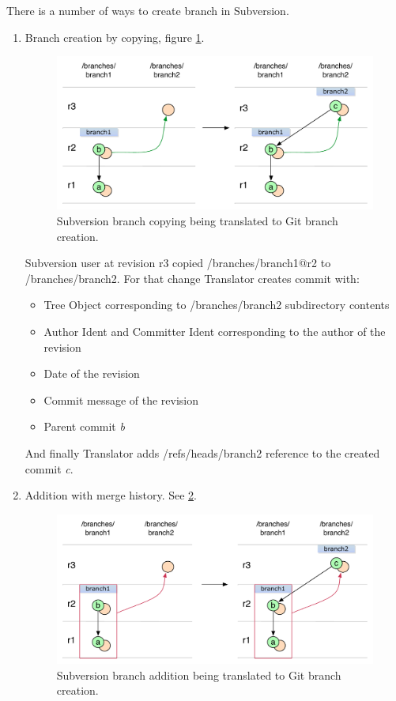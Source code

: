 There is a number of ways to create branch in Subversion.

\begin{enumerate}
\compactlist
\item Branch creation by copying, figure \ref{svn_branch_creation}.

\begin{figure}[!h]
\centering
\includegraphics[width=\linewidth]{img/diagrams/branch_creation_svn_to_git.pdf}
\caption{Subversion branch copying being translated to Git branch creation.}
\label{svn_branch_creation}
\end{figure}

Subversion user at revision r3 copied /branches/branch1@r2 to /branches/branch2. For that change Translator creates commit with:
\begin{itemize}
	\item Tree Object corresponding to /branches/branch2 subdirectory contents
	\item Author Ident and Committer Ident corresponding to the author of the revision
	\item Date of the revision
	\item Commit message of the revision
	\item Parent commit \emph{b}
\end{itemize}
And finally Translator adds /refs/heads/branch2 reference to the created commit \emph{c}.

\item Addition with merge history. See \ref{svn_branch_creation_from_mergeinfo}.

\begin{figure}[!h]
\centering
\includegraphics[width=\linewidth]{img/diagrams/branch_creation_from_mergeinfo_svn_to_git.pdf}
\caption{Subversion branch addition being translated to Git branch creation.}
\label{svn_branch_creation_from_mergeinfo}
\end{figure}


\end{enumerate}
